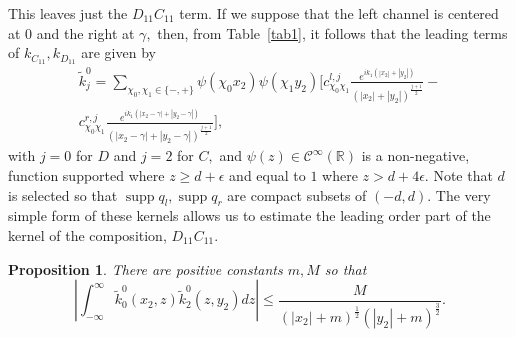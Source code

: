 \documentclass[11pt]{article}
\newcommand\tk{\tilde k}
\newcommand\cC{\mathcal{C}}
\newcommand\bbR{\mathbb R}
\newcommand\supp{\operatorname{supp}}
\newtheorem{proposition}{Proposition}
\theoremstyle{definition}
\theoremstyle{remark}
\begin{document}
This leaves just the $D_{11}C_{11}$ term. If we suppose that the left channel is
centered at $0$ and the right at $\gamma,$ then,
from Table~\ref{tab1}, it follows that  the leading terms of $k_{C_{11}},k_{D_{11}}$ are given by
   \begin{multline}\label{eqn164.95}
     \tk^{0}_{j}=\sum_{\chi_0,\chi_1\in\{-,+\}}
     \psi(\chi_0 x_2)
     \psi(\chi_1y_2)\Bigg[c_{\chi_0\chi_1}^{l,j}\frac{e^{ik_1(|x_2|+|y_2|)}}{(|x_2|+|y_2|)^{\frac{j+1}{2}}}-\\
       c_{\chi_0\chi_1}^{r,j}\frac{e^{ik_1(|x_2-\gamma|+|y_2-\gamma|)}}{(|x_2-\gamma|+|y_2-\gamma|)^{\frac{j+1}{2}}}\Bigg],
   \end{multline}
   with $j=0$ for $D$ and $j=2$ for $C,$ and $\psi(z)\in\cC^{\infty}(\bbR)$ is a
   non-negative,  function supported where $z\geq d+\epsilon$ and equal to $1$
   where $z>d+4\epsilon.$ Note that $d$ is selected so that $\supp q_l,\supp
   q_r$ are compact subsets of $(-d,d).$ The very simple form of these kernels
   allows us to estimate the leading order part of the kernel of the
   composition, $D_{11}C_{11}.$
   \begin{proposition}\label{prop2.96}
     There are positive constants $m,M$ so that
     \begin{equation}\label{eqn165.95}
       \left|\int_{-\infty}^{\infty}\tk^0_0(x_2,z)\tk^0_2(z,y_2)dz\right|\leq
       \frac{M}{(|x_2|+m)^{\frac 12}(|y_2|+m)^{\frac 32}}.
     \end{equation}
   \end{proposition}
\end{document}
